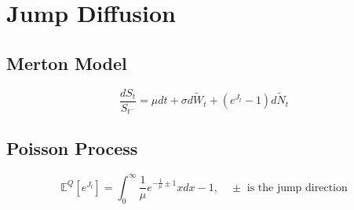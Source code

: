 \documentclass[a4paper, DIV19,12pt]{scrartcl}
\newcommand{\bparens}  [1]{\left(       #1 \right)      } %
\begin{document}
\section{Jump Diffusion}

\subsection{Merton Model}

\begin{equation}
\frac{dS_t}{S_{t^-}} = \mu dt + \sigma d\tilde{W}_t + \bparens{e^{J_t} -1} d\tilde{N}_t
\end{equation}

\subsection{Poisson Process}

\begin{equation}
\mathbb{E}^Q [ e^{J_t} ] = \int_0^\infty \frac{1}{\mu} e^{-\frac{1}{\mu} \pm 1}x dx -1, \quad \pm \text{ is the jump direction}
\end{equation}
\end{document}

